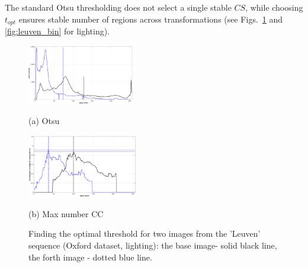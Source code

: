 \documentclass{article}
\begin{document}
The standard Otsu thresholding does not select a single stable $CS$, while choosing $t_{opt}$ ensures stable number of regions across transformations (see Figs.~\ref{fig:binary_hist} and \ref{fig:leuven_bin} for lighting).
\vspace{-0.8cm}
\begin{figure}[htb]

\begin{minipage}[b]{0.49\linewidth}
  \centering
  \centerline{\includegraphics[width=4.65cm]{./Figs/hist_otsu_leuven_1_4}}
  \centerline{(a) Otsu}\medskip
\end{minipage}
\hfill
\begin{minipage}[b]{0.49\linewidth}
  \centering
  \centerline{\includegraphics[width=4.8cm]{./Figs/hist_numcc_leuven_1_4}}
\centerline{(b) Max number CC}\medskip
\end{minipage}
\hfill
\vspace{-0.5cm}
\caption{Finding the optimal threshold for two images from the 'Leuven' sequence 
(Oxford dataset, lighting): the base image- solid black line, the forth image - dotted blue line.}
\label{fig:binary_hist}
%
\end{figure}
\end{document}
